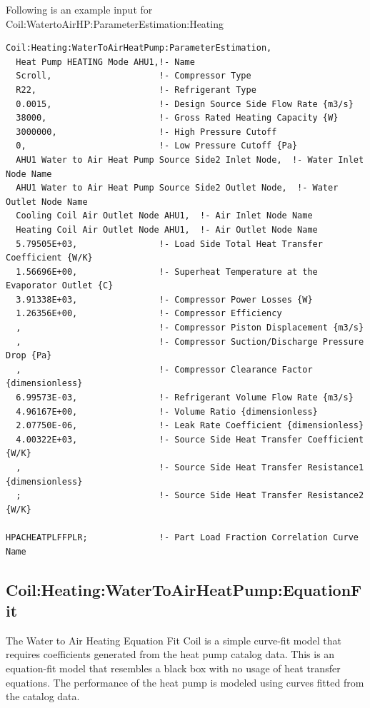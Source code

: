 Following is an example input for Coil:WatertoAirHP:ParameterEstimation:Heating

\begin{lstlisting}
Coil:Heating:WaterToAirHeatPump:ParameterEstimation,
  Heat Pump HEATING Mode AHU1,!- Name
  Scroll,                     !- Compressor Type
  R22,                        !- Refrigerant Type
  0.0015,                     !- Design Source Side Flow Rate {m3/s}
  38000,                      !- Gross Rated Heating Capacity {W}
  3000000,                    !- High Pressure Cutoff
  0,                          !- Low Pressure Cutoff {Pa}
  AHU1 Water to Air Heat Pump Source Side2 Inlet Node,  !- Water Inlet Node Name
  AHU1 Water to Air Heat Pump Source Side2 Outlet Node,  !- Water Outlet Node Name
  Cooling Coil Air Outlet Node AHU1,  !- Air Inlet Node Name
  Heating Coil Air Outlet Node AHU1,  !- Air Outlet Node Name
  5.79505E+03,                !- Load Side Total Heat Transfer Coefficient {W/K}
  1.56696E+00,                !- Superheat Temperature at the Evaporator Outlet {C}
  3.91338E+03,                !- Compressor Power Losses {W}
  1.26356E+00,                !- Compressor Efficiency
  ,                           !- Compressor Piston Displacement {m3/s}
  ,                           !- Compressor Suction/Discharge Pressure Drop {Pa}
  ,                           !- Compressor Clearance Factor {dimensionless}
  6.99573E-03,                !- Refrigerant Volume Flow Rate {m3/s}
  4.96167E+00,                !- Volume Ratio {dimensionless}
  2.07750E-06,                !- Leak Rate Coefficient {dimensionless}
  4.00322E+03,                !- Source Side Heat Transfer Coefficient {W/K}
  ,                           !- Source Side Heat Transfer Resistance1 {dimensionless}
  ;                           !- Source Side Heat Transfer Resistance2 {W/K}

HPACHEATPLFFPLR;              !- Part Load Fraction Correlation Curve Name
\end{lstlisting}

\subsection{Coil:Heating:WaterToAirHeatPump:EquationFit}\label{coilheatingwatertoairheatpumpequationfit}

The Water to Air Heating Equation Fit Coil is a simple curve-fit model that requires coefficients generated from the heat pump catalog data. This is an equation-fit model that resembles a black box with no usage of heat transfer equations. The performance of the heat pump is modeled using curves fitted from the catalog data.


